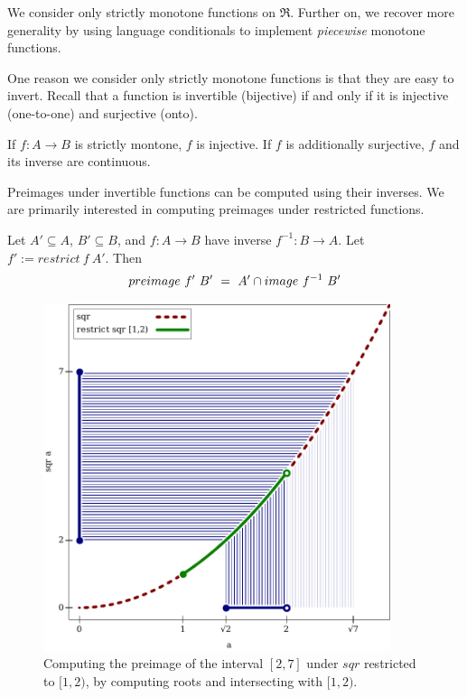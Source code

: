 We consider only strictly monotone functions on $\Re$.
Further on, we recover more generality by using language conditionals to implement \emph{piecewise} monotone functions.

One reason we consider only strictly monotone functions is that they are easy to invert.
Recall that a function is invertible (bijective) if and only if it is injective (one-to-one) and surjective (onto).

\begin{lemma}
\label{lem:monotone-implies-invertible}
If $f : A \to B$ is strictly montone, $f$ is injective.
If $f$ is additionally surjective, $f$ and its inverse are continuous.
\end{lemma}

Preimages under invertible functions can be computed using their inverses.
We are primarily interested in computing preimages under restricted functions.

\begin{lemma}
\label{lem:invertible-function-preimages}
Let $A' \subseteq A$, $B' \subseteq B$, and $f : A \to B$ have inverse $f^{-1} : B \to A$.
Let $f' := restrict~f~A'$. Then
\begin{equation}
	preimage~f'~B'\ =\ A' \cap image~f^{-1}~B'
\end{equation}
\end{lemma}

\begin{figure}[!tb]
\centering
\includegraphics[width=4in]{figures/preimage-by-inverse-image}
\caption[ ]{Computing the preimage of the interval $[2,7]$ under $sqr$ restricted to $[1,2)$, by computing roots and intersecting with $[1,2)$.}
\label{fig:sqr-preimage}
\end{figure}

